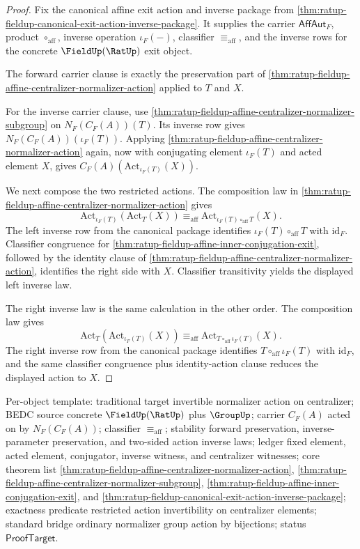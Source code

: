 \begin{proof}
Fix the canonical affine exit action and inverse package from
\autoref{thm:ratup-fieldup-canonical-exit-action-inverse-package}. It supplies
the carrier $\mathsf{AffAut}_F$, product $\circ_{\mathrm{aff}}$, inverse
operation $\iota_F(-)$, classifier $\equiv_{\mathrm{aff}}$, and the inverse rows
for the concrete $\FieldUp(\RatUp)$ exit object.

The forward carrier clause is exactly the preservation part of
\autoref{thm:ratup-fieldup-affine-centralizer-normalizer-action} applied to
$T$ and $X$.

For the inverse carrier clause, use
\autoref{thm:ratup-fieldup-affine-centralizer-normalizer-subgroup} on
$N_F(C_F(A))(T)$. Its inverse row gives $N_F(C_F(A))(\iota_F(T))$. Applying
\autoref{thm:ratup-fieldup-affine-centralizer-normalizer-action} again, now with
conjugating element $\iota_F(T)$ and acted element $X$, gives
$C_F(A)(\mathrm{Act}_{\iota_F(T)}(X))$.

We next compose the two restricted actions. The composition law in
\autoref{thm:ratup-fieldup-affine-centralizer-normalizer-action} gives
$$
\mathrm{Act}_{\iota_F(T)}(\mathrm{Act}_T(X))\equiv_{\mathrm{aff}}
\mathrm{Act}_{\iota_F(T)\circ_{\mathrm{aff}}T}(X).
$$
The left inverse row from the canonical package identifies
$\iota_F(T)\circ_{\mathrm{aff}}T$ with $\mathrm{id}_F$. Classifier congruence for
\autoref{thm:ratup-fieldup-affine-inner-conjugation-exit}, followed by the
identity clause of
\autoref{thm:ratup-fieldup-affine-centralizer-normalizer-action}, identifies the
right side with $X$. Classifier transitivity yields the displayed left inverse
law.

The right inverse law is the same calculation in the other order. The
composition law gives
$$
\mathrm{Act}_T(\mathrm{Act}_{\iota_F(T)}(X))\equiv_{\mathrm{aff}}
\mathrm{Act}_{T\circ_{\mathrm{aff}}\iota_F(T)}(X).
$$
The right inverse row from the canonical package identifies
$T\circ_{\mathrm{aff}}\iota_F(T)$ with $\mathrm{id}_F$, and the same classifier
congruence plus identity-action clause reduces the displayed action to $X$.
\end{proof}

Per-object template: traditional target invertible normalizer action on
centralizer; BEDC source concrete $\FieldUp(\RatUp)$ plus $\GroupUp$; carrier
$C_F(A)$ acted on by $N_F(C_F(A))$; classifier $\equiv_{\mathrm{aff}}$;
stability forward preservation, inverse-parameter preservation, and two-sided
action inverse laws; ledger fixed element, acted element, conjugator, inverse
witness, and centralizer witnesses; core theorem list
\autoref{thm:ratup-fieldup-affine-centralizer-normalizer-action},
\autoref{thm:ratup-fieldup-affine-centralizer-normalizer-subgroup},
\autoref{thm:ratup-fieldup-affine-inner-conjugation-exit}, and
\autoref{thm:ratup-fieldup-canonical-exit-action-inverse-package}; exactness
predicate restricted action invertibility on centralizer elements; standard
bridge ordinary normalizer group action by bijections; status
$\mathsf{ProofTarget}$.

